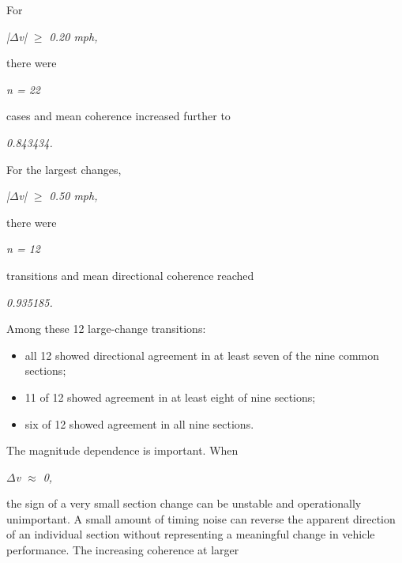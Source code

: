 For

\begin{center}\textit{|\ensuremath{\Delta}v| \ensuremath{\ge} 0.20 mph,}\end{center}

there were

\begin{center}\textit{n = 22}\end{center}

cases and mean coherence increased further to

\begin{center}\textit{0.843434.}\end{center}

For the largest changes,

\begin{center}\textit{|\ensuremath{\Delta}v| \ensuremath{\ge} 0.50 mph,}\end{center}

there were

\begin{center}\textit{n = 12}\end{center}

transitions and mean directional coherence reached

\begin{center}\textit{0.935185.}\end{center}

Among these 12 large-change transitions:

\begin{itemize}
\item all 12 showed directional agreement in at least seven of the nine common sections;
\item 11 of 12 showed agreement in at least eight of nine sections;
\item six of 12 showed agreement in all nine sections.
\end{itemize}

The magnitude dependence is important. When

\begin{center}\textit{\ensuremath{\Delta}v \ensuremath{\approx} 0,}\end{center}

the sign of a very small section change can be unstable and operationally unimportant. A small amount of timing noise can reverse the apparent direction of an individual section without representing a meaningful change in vehicle performance. The increasing coherence at larger


